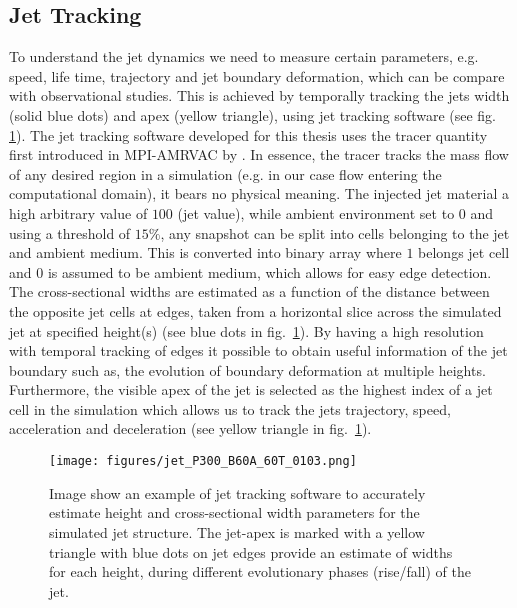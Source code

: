 \documentclass[12pt]{ociamthesis}
\newcommand{\fref}[1]{fig. \ref{#1}}
\begin{document}
\subsection{Jet Tracking}
\label{subsec:jet_tracking}
To understand the jet dynamics we need to measure certain parameters, e.g. speed, life time, trajectory and jet boundary deformation, which can be compare with observational studies. This is achieved by temporally tracking the jets width (solid blue dots) and apex (yellow triangle), using jet tracking software (see \fref{jet_tracker}). The jet tracking software developed for this thesis uses the tracer quantity first introduced in MPI-AMRVAC by \cite{Porth_2014}. In essence, the tracer tracks the mass flow of any desired region in a simulation (e.g. in our case flow entering the computational domain), it bears no physical meaning. The injected jet material a high arbitrary value of $100$ (jet value), while ambient environment set to 0 and using a threshold of $15\%$, any snapshot can be split into cells belonging to the jet and ambient medium. This is converted into binary array where $1$ belongs jet cell and $0$ is assumed to be ambient medium, which allows for easy edge detection. The cross-sectional widths are estimated as a function of the distance between the opposite jet cells at edges, taken from a horizontal slice across the simulated jet at specified height(s) (see blue dots in fig.~\ref{jet_tracker}). By having a high resolution with temporal tracking of edges it possible to obtain useful information of the jet boundary such as, the evolution of boundary deformation at multiple heights. Furthermore, the visible apex of the jet is selected as the highest index of a jet cell in the simulation which allows us to track the jets trajectory, speed, acceleration and deceleration (see yellow triangle in fig.~\ref{jet_tracker}).
\begin{figure}
\centering
{\texttt{[image: figures/jet\_P300\_B60A\_60T\_0103.png]}} 
\caption{Image show an example of jet tracking software to accurately estimate height and cross-sectional width parameters for the simulated jet structure. The jet-apex is marked with a yellow triangle with blue dots on jet edges provide an estimate of widths for each height, during different evolutionary phases (rise/fall) of the jet.}
\label{jet_tracker}
\end{figure}
\end{document}
